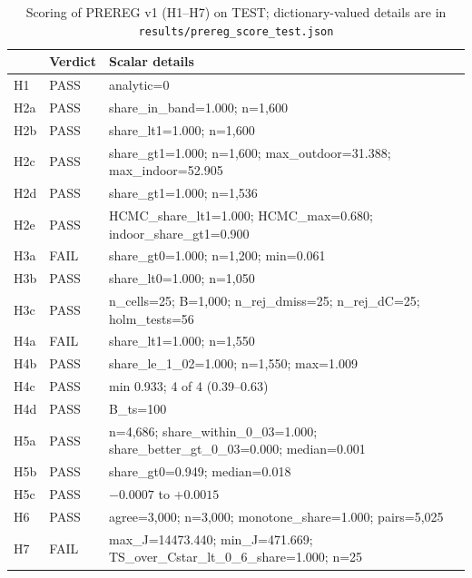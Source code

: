 \begin{table}[H]\centering\footnotesize\caption{Scoring of PREREG v1 (H1--H7) on TEST; dictionary-valued details are in \texttt{results/prereg\_score\_test.json}}\label{tab:s_prereg}
\begin{tabular}{@{}llp{}@{}}\toprule
 & Verdict & Scalar details\\\midrule
H1 & PASS & \parbox[t]{0.68\textwidth}{\raggedright analytic=0}\\
H2a & PASS & \parbox[t]{0.68\textwidth}{\raggedright share\_in\_band=1.000; n=1{,}600}\\
H2b & PASS & \parbox[t]{0.68\textwidth}{\raggedright share\_lt1=1.000; n=1{,}600}\\
H2c & PASS & \parbox[t]{0.68\textwidth}{\raggedright share\_gt1=1.000; n=1{,}600; max\_outdoor=31.388; max\_indoor=52.905}\\
H2d & PASS & \parbox[t]{0.68\textwidth}{\raggedright share\_gt1=1.000; n=1{,}536}\\
H2e & PASS & \parbox[t]{0.68\textwidth}{\raggedright HCMC\_share\_lt1=1.000; HCMC\_max=0.680; indoor\_share\_gt1=0.900}\\
H3a & FAIL & \parbox[t]{0.68\textwidth}{\raggedright share\_gt0=1.000; n=1{,}200; min=0.061}\\
H3b & PASS & \parbox[t]{0.68\textwidth}{\raggedright share\_lt0=1.000; n=1{,}050}\\
H3c & PASS & \parbox[t]{0.68\textwidth}{\raggedright n\_cells=25; B=1{,}000; n\_rej\_dmiss=25; n\_rej\_dC=25; holm\_tests=56}\\
H4a & FAIL & \parbox[t]{0.68\textwidth}{\raggedright share\_lt1=1.000; n=1{,}550}\\
H4b & PASS & \parbox[t]{0.68\textwidth}{\raggedright share\_le\_1\_02=1.000; n=1{,}550; max=1.009}\\
H4c & PASS & \parbox[t]{0.68\textwidth}{\raggedright min 0.933; 4 of 4 (0.39--0.63)}\\
H4d & PASS & \parbox[t]{0.68\textwidth}{\raggedright B\_ts=100}\\
H5a & PASS & \parbox[t]{0.68\textwidth}{\raggedright n=4{,}686; share\_within\_0\_03=1.000; share\_better\_gt\_0\_03=0.000; median=0.001}\\
H5b & PASS & \parbox[t]{0.68\textwidth}{\raggedright share\_gt0=0.949; median=0.018}\\
H5c & PASS & \parbox[t]{0.68\textwidth}{\raggedright $-0.0007$ to $+0.0015$}\\
H6 & PASS & \parbox[t]{0.68\textwidth}{\raggedright agree=3{,}000; n=3{,}000; monotone\_share=1.000; pairs=5{,}025}\\
H7 & FAIL & \parbox[t]{0.68\textwidth}{\raggedright max\_J=14473.440; min\_J=471.669; TS\_over\_Cstar\_lt\_0\_6\_share=1.000; n=25}\\
\bottomrule\end{tabular}\end{table}

